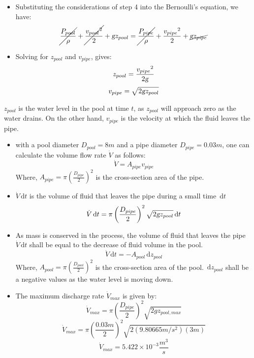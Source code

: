 \documentclass{article}
\newcommand{\ud}{\,\mathrm{d}}
\begin{document}
\begin{itemize}
\item Substituting the considerations of step 4 into the Bernoulli's equation, we have:
$$ \cancel{\frac{P_{pool}}{\rho}} + \cancel{\frac{{v_{pool}}^2}{2}} + \textsl{g} z_{pool} = \cancel{\frac{P_{pipe}}{\rho}} + \frac{{v_{pipe}}^2}{2} + \cancel{\textsl{g} z_{pipe}} $$
\end{itemize}

\begin{itemize}
\item Solving for $z_{pool}$ and $v_{pipe}$, gives:
$$ z_{pool} = \frac{{v_{pipe}}^2}{2 \textsl{g}} $$
$$ v_{pipe} = \sqrt{2 \textsl{g} z_{pool}} $$
\end{itemize}

$z_{pool}$ is the water level in the pool at time $t$, as $z_{pool}$ will approach zero as the water drains. On the other hand, $v_{pipe}$ is the velocity at which the fluid leaves the pipe.

\begin{itemize}
\item with a pool diameter $D_{pool} = 8m$ and a pipe diameter $D_{pipe} = 0.03m$, one can calculate the volume flow rate $\dot{V}$ as follows:
$$ \dot{V} = A_{pipe} v_{pipe} $$
Where, $\displaystyle A_{pipe} = \pi \left( \frac{D_{pipe}}{2} \right)^2$ is the cross-section area of the pipe.
\end{itemize}

\begin{itemize}
\item $\dot{V} \ud t$ is the volume of fluid that leaves the pipe during a small time $\ud t$
$$ \dot{V} \ud t = \pi \left( \frac{D_{pipe}}{2} \right)^2 \sqrt{2 \textsl{g} z_{pool}} \ud t $$
\end{itemize}

\begin{itemize}
\item As mass is conserved in the process, the volume of fluid that leaves the pipe $\dot{V} \ud t$ shall be equal to the decrease of fluid volume in the pool.
$$ \dot{V} \ud t = - A_{pool} \ud z_{pool} $$
Where, $\displaystyle A_{pool} = \pi \left( \frac{D_{pool}}{2} \right)^2$ is the cross-section area of the pool. $\ud z_{pool}$ shall be a negative values as the water level is moving down.
\end{itemize}

\begin{itemize}
\item The maximum discharge rate $\dot{V}_{max}$ is given by:
$$ \dot{V}_{max} = \pi \left( \frac{D_{pipe}}{2} \right)^2 \sqrt{2 g z_{pool,max}} $$
$$ \dot{V}_{max} = \pi \left( \frac{0.03m}{2} \right)^2 \sqrt{2 (9.80665 m/s^2) (3m)} $$
$$ \dot{V}_{max} = 5.422 \times 10^{-3} \frac{m^3}{s} $$
\end{itemize}
\end{document}
